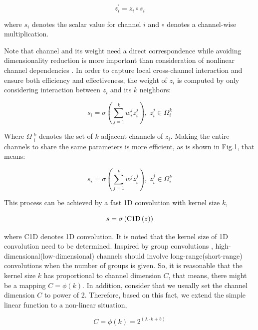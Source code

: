\documentclass[review]{elsarticle}
\begin{document}
\begin{equation}
{z_i^{'}}= {z_i} \circ {s_i}
\end{equation}

where ${s_i}$ denotes the scalar value for channel $i$ and $ \circ $ denotes a channel-wise multiplication.

Note that channel and its weight need a direct correspondence while avoiding dimensionality reduction is more important than consideration of nonlinear channel dependencies \cite{18wang2020eca}. In order to capture local cross-channel interaction and ensure both efficiency and effectiveness, the weight of ${z_i}$  is computed by only considering interaction between ${z_i}$ and its $k$  neighbors:

\begin{equation}
{s_i} = \sigma \left( {\sum\limits_{j = 1}^k {w_i^jz_i^j} } \right),\;z_i^j \in \Omega _i^k
\end{equation}

Where $\Omega \;_i^k$ denotes the set of $k$ adjacent channels of ${z_i}$. Making the entire channels to share the same parameters is more efficient, as is shown in Fig.1, that means:

\begin{equation}
{s_i} = \sigma \left( {\sum\limits_{j = 1}^k {{w^j}z_i^j} } \right),\;z_i^j \in \Omega _i^k
\end{equation}

This process can be achieved by a fast 1D convolution with kernel size $k$,

\begin{equation}
s = \sigma \left( {{\rm{C1D}}\left( z \right)} \right)
\end{equation}

where C1D denotes 1D convolution. It is noted that the kernel size of 1D convolution need to be determined. Inspired by group convolutions \cite{19ioannou2017deep}, high-dimensional(low-dimensional) channels should involve long-range(short-range) convolutions when the number of groups is given. So, it is reasonable that the kernel size $k$ has proportional to channel dimension $C$, that means, there might be a mapping $C = \phi \left( k \right)$.  In addition, consider that we usually set the channel dimension $C$ to power of 2. Therefore, based on this fact, we extend the simple linear function to a non-linear situation,

\begin{equation}
C = \phi \left( k \right) = {2^{\left( {\lambda  \cdot k + b} \right)}}
\end{equation}
\end{document}
